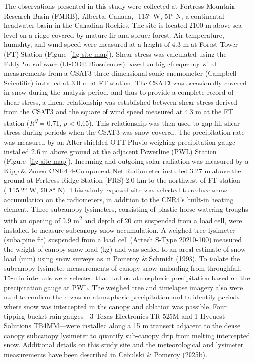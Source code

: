 \documentclass[
]{agujournal2019}
\begin{document}
The observations presented in this study were collected at Fortress
Mountain Research Basin (FMRB), Alberta, Canada, -115° W, 51° N, a
continental headwater basin in the Canadian Rockies. The site is located
2100 m above sea level on a ridge covered by mature fir and spruce
forest. Air temperature, humidity, and wind speed were measured at a
height of 4.3 m at Forest Tower (FT) Station
(Figure~\ref{fig-site-map}). Shear stress was calculated using the
EddyPro software (LI-COR Biosciences) based on high-frequency wind
measurements from a CSAT3 three-dimensional sonic anemometer (Campbell
Scientific) installed at 3.0 m at FT station. The CSAT3 was occasionally
covered in snow during the analysis period, and thus to provide a
complete record of shear stress, a linear relationship was established
between shear stress derived from the CSAT3 and the square of wind speed
measured at 4.3 m at the FT station (\emph{R\textsuperscript{2}} = 0.71,
\emph{p} \textless{} 0.05). This relationship was then used to gap-fill
shear stress during periods when the CSAT3 was snow-covered. The
precipitation rate was measured by an Alter-shielded OTT Pluvio weighing
precipitation gauge installed 2.6 m above ground at the adjacent
Powerline (PWL) Station (Figure~\ref{fig-site-map}). Incoming and
outgoing solar radiation was measured by a Kipp \& Zonen CNR4
4-Component Net Radiometer installed 3.27 m above the ground at Fortress
Ridge Station (FRS) 2.0 km to the northwest of FT station (-115.2° W,
50.8° N). This windy exposed site was selected to reduce snow
accumulation on the radiometers, in addition to the CNR4's built-in
heating element. Three subcanopy lysimeters, consisting of plastic
horse-watering troughs with an opening of 0.9 m\textsuperscript{2} and
depth of 20 cm suspended from a load cell, were installed to measure
subcanopy snow accumulation. A weighed tree lysimeter (subalpine fir)
suspended from a load cell (Artech S-Type 20210-100) measured the weight
of canopy snow load (kg) and was scaled to an areal estimate of snow
load (mm) using snow surveys as in Pomeroy \& Schmidt (1993). To isolate
the subcanopy lysimeter measurements of canopy snow unloading from
throughfall, 15-min intervals were selected that had no atmospheric
precipitation based on the precipitation gauge at PWL. The weighed tree
and timelapse imagery also were used to confirm there was no atmospheric
precipitation and to identify periods where snow was intercepted in the
canopy and ablation was possible. Four tipping bucket rain gauges---3
Texas Electronics TR-525M and 1 Hyquest Solutions TB4MM---were installed
along a 15 m transect adjacent to the dense canopy subcanopy lysimeter
to quantify sub-canopy drip from melting intercepted snow. Additional
details on this study site and the meteorological and lysimeter
measurements have been described in Cebulski \& Pomeroy (2025b).
\end{document}
